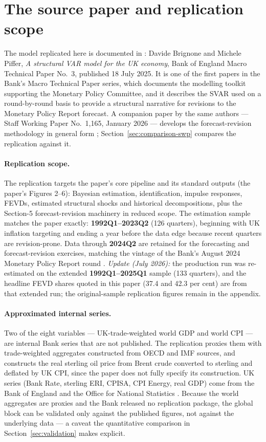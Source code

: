 \section{The source paper and replication scope}
\label{sec:source}

The model replicated here is documented in \citet{brignone2025}: Davide Brignone and Michele Piffer, \emph{A structural VAR model for the UK economy}, Bank of England Macro Technical Paper No.~3, published 18 July 2025. It is one of the first papers in the Bank's Macro Technical Paper series, which documents the modelling toolkit supporting the Monetary Policy Committee, and it describes the SVAR used on a round-by-round basis to provide a structural narrative for revisions to the Monetary Policy Report forecast. A companion paper by the same authors --- Staff Working Paper No.~1{,}165, January 2026 --- develops the forecast-revision methodology in general form \citep{brignone2026}; Section~\ref{sec:comparison-swp} compares the replication against it.

\paragraph{Replication scope.} The replication targets the paper's core pipeline and its standard outputs (the paper's Figures 2--6): Bayesian estimation, identification, impulse responses, FEVDs, estimated structural shocks and historical decompositions, plus the Section-5 forecast-revision machinery in reduced scope. The estimation sample matches the paper exactly: \textbf{1992Q1--2023Q2} (126 quarters), beginning with UK inflation targeting and ending a year before the data edge because recent quarters are revision-prone. Data through \textbf{2024Q2} are retained for the forecasting and forecast-revision exercises, matching the vintage of the Bank's August 2024 Monetary Policy Report round \citep{boe2024mpr}. \emph{Update (July 2026):} the production run was re-estimated on the extended \textbf{1992Q1--2025Q1} sample (133 quarters), and the headline FEVD shares quoted in this paper (37.4 and 42.3 per cent) are from that extended run; the original-sample replication figures remain in the appendix.

\paragraph{Approximated internal series.} Two of the eight variables --- UK-trade-weighted world GDP and world CPI --- are internal Bank series that are not published. The replication proxies them with trade-weighted aggregates constructed from OECD and IMF sources, and constructs the real sterling oil price from Brent crude converted to sterling and deflated by UK CPI, since the paper does not fully specify its construction. UK series (Bank Rate, sterling ERI, CPISA, CPI Energy, real GDP) come from the Bank of England and the Office for National Statistics \citep{ons2025gdp, ons2024cpi}. Because the world aggregates are proxies and the Bank released no replication package, the global block can be validated only against the published figures, not against the underlying data --- a caveat the quantitative comparison in Section~\ref{sec:validation} makes explicit.

